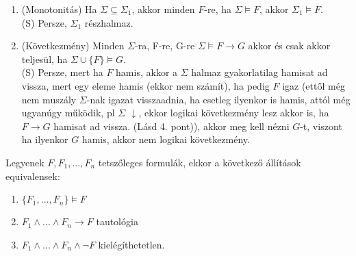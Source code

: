 \documentclass{beamer}
\begin{document}
\begin{frame}
\begin{tcolorbox}[title={Ész}]
\begin{enumerate}
{\tiny (S) 3. 5. 8. pontok összekombinálása eggyé.}\\
\item (Monotonitás) Ha $\Sigma \subseteq {\Sigma}_1$, akkor minden $F$-re, ha $\Sigma \models F$, akkor ${\Sigma}_1 \models F$.\\
{\tiny (S) Persze, ${\Sigma}_1$ részhalmaz.}\\
\item (Következmény) Minden $\Sigma$-ra, F-re, G-re $\Sigma \models F \rightarrow G$ akkor és csak akkor teljesül, ha $\Sigma \cup \{F\} \models G$.\\
{\tiny (S) Persze, mert ha $F$ hamis, akkor a $\Sigma$ halmaz gyakorlatilag hamisat ad vissza, mert egy eleme hamis (ekkor nem számít), ha pedig $F$ igaz (ettől még nem muszály $\Sigma$-nak igazat visszaadnia, ha esetleg ilyenkor is hamis, attól még ugyanúgy működik, pl $\Sigma$ $\downarrow$, ekkor logikai következmény lesz akkor is, ha $F \rightarrow G$ hamisat ad vissza. (Lásd 4. pont)), akkor meg kell nézni $G$-t, viszont ha ilyenkor $G$ hamis, akkor nem logikai következmény.}
\end{enumerate}
\end{tcolorbox}

\end{frame}

\begin{frame}

\begin{tcolorbox}[title={tétel: Ekvivalens állítások formulákra}]
Legyenek $F, F_1, ... , F_n$ tetszőleges formulák, ekkor a következő állítások equivalensek:
\begin{enumerate}
\item $\{F_1, ... , F_n\} \models F$
\item $F_1 \land ... \land F_n \rightarrow F$ tautológia
\item $F_1 \land ... \land F_n \land \neg F$ kielégíthetetlen.
\end{enumerate}
\end{tcolorbox}

\end{frame}
\end{document}
